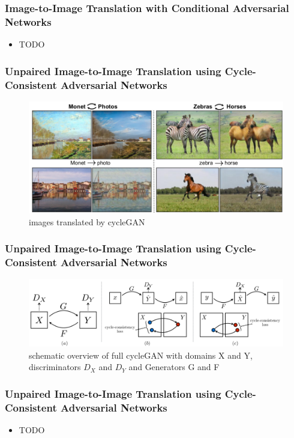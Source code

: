 \documentclass{beamer}
\begin{document}
\begin{frame}
\frametitle{Image-to-Image Translation with Conditional Adversarial Networks}

\begin{itemize}
	\item TODO
\end{itemize}
\end{frame}

\begin{frame}
\frametitle{Unpaired Image-to-Image Translation	using Cycle-Consistent Adversarial Networks}
\cite{ui2i}
\begin{figure}
	\includegraphics[width=0.9\linewidth]{../images/ui2i.png}
	\caption{images translated by cycleGAN}
\end{figure}
\end{frame}

\begin{frame}
\frametitle{Unpaired Image-to-Image Translation	using Cycle-Consistent Adversarial Networks}
\cite{ui2i}
\begin{figure}
	\includegraphics[width=\linewidth]{../images/ui2i_cycleGAN.png}
	\caption{schematic overview of full cycleGAN with domains X and Y, discriminators $D_X$ and $D_Y$ and Generators G and F}
\end{figure}
\end{frame}

\begin{frame}
\frametitle{Unpaired Image-to-Image Translation	using Cycle-Consistent Adversarial Networks}

\begin{itemize}
	\item TODO
\end{itemize}

\end{frame}
\end{document}
